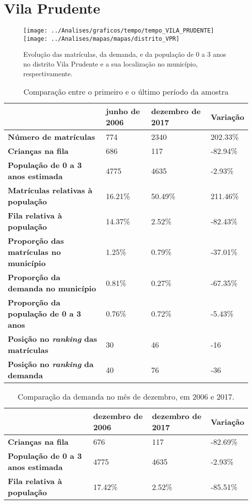 \section{Vila Prudente}
\begin{figure}[H]
	\centering
	\texttt{[image: ../Analises/graficos/tempo/tempo\_VILA\_PRUDENTE]}
	\texttt{[image: ../Analises/mapas/mapas/distrito\_VPR]}
	\caption{Evolução das matrículas, da demanda, e da população de 0 a 3 anos no distrito Vila Prudente e a sua localização no município, respectivamente.}
\end{figure}
\begin{table}[H]
	\begin{tabular}{|l|l|l|l|}
		\hline
		\textbf{}                                      & \textbf{junho de 2006}       & \textbf{dezembro de 2017}    & \textbf{Variação} \\ \hline
		\textbf{Número de matrículas}                  & 774 & 2340 & 202.33\% \\ \hline
		\textbf{Crianças na fila}                      & 686 & 117 & -82.94\% \\ \hline
		\textbf{População de 0 a 3 anos estimada}      & 4775 & 4635 & -2.93\% \\ \hline
		\textbf{Matrículas relativas à população}      & 16.21\% & 50.49\% & 211.46\% \\ \hline
		\textbf{Fila relativa à população}             & 14.37\% & 2.52\% & -82.43\% \\ \hline
		\textbf{Proporção das matrículas no município} & 1.25\% & 0.79\% & -37.01\% \\ \hline
		\textbf{Proporção da demanda no município}     & 0.81\% & 0.27\% & -67.35\% \\ \hline
		\textbf{Proporção da população de 0 a 3 anos}  & 0.76\% & 0.72\% & -5.43\% \\ \hline
		\textbf{Posição no \textit{ranking} das matrículas}     & 30 & 46 & -16 \\ \hline
		\textbf{Posição no \textit{ranking} da demanda}         & 40 & 76 & -36 \\ \hline
	\end{tabular}
	\caption{Comparação entre o primeiro e o último período da amostra}
\end{table}
\begin{table}[H]
	\begin{tabular}{|l|l|l|l|}
		\hline
		\textbf{}                                 & \textbf{dezembro de 2006} & \textbf{dezembro de 2017} & \textbf{Variação} \\ \hline
		\textbf{Crianças na fila}                      & 676 & 117 & -82.69\% \\ \hline
		\textbf{População de 0 a 3 anos estimada}      & 4775 & 4635 & -2.93\% \\ \hline
		\textbf{Fila relativa à população}             & 17.42\% & 2.52\% & -85.51\% \\ \hline
	\end{tabular}
	\caption{Comparação da demanda no mês de dezembro, em 2006 e 2017.}
\end{table}
